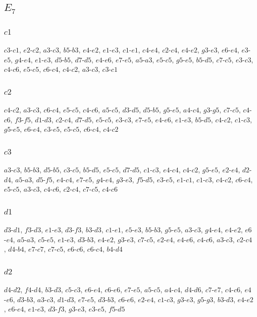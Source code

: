 \documentclass{article}
\begin{document}
\subsection{$E_7$}
\subsubsection{\large $c1$}
$c3$-$c1$, $e2$-$c2$, $a3$-$c3$, $b5$-$b3$, $e4$-$e2$, $e1$-$e3$, $c1$-$e1$, $c4$-$e4$, $c2$-$c4$, $e4$-$e2$, $g3$-$e3$, $e6$-$e4$, $e3$-$e5$, $g4$-$e4$, $e1$-$e3$, $d5$-$b5$, $d7$-$d5$, $e4$-$e6$, $e7$-$e5$, $a5$-$a3$, $e5$-$c5$, $g5$-$e5$, $b5$-$d5$, $c7$-$c5$, $e3$-$c3$, $c4$-$c6$, $e5$-$c5$, $c6$-$c4$, $c4$-$c2$, $a3$-$c3$, $c3$-$c1$

\subsubsection{\large $c2$}
$c4$-$c2$, $a3$-$c3$, $c6$-$c4$, $e5$-$c5$, $c4$-$c6$, $a5$-$c5$, $d3$-$d5$, $d5$-$b5$, $g5$-$e5$, $a4$-$c4$, $g3$-$g5$, $c7$-$c5$, $c4$-$c6$, $f3$-$f5$, $d1$-$d3$, $c2$-$c4$, $d7$-$d5$, $e5$-$c5$, $e3$-$c3$, $e7$-$e5$, $e4$-$e6$, $e1$-$e3$, $b5$-$d5$, $c4$-$c2$, $c1$-$c3$, $g5$-$e5$, $e6$-$e4$, $e3$-$e5$, $e5$-$c5$, $c6$-$c4$, $c4$-$c2$

\subsubsection{\large $c3$}
$a3$-$c3$, $b5$-$b3$, $d5$-$b5$, $c3$-$c5$, $b5$-$d5$, $e5$-$c5$, $d7$-$d5$, $c1$-$c3$, $e4$-$c4$, $c4$-$c2$, $g5$-$e5$, $e2$-$e4$, $d2$-$d4$, $a5$-$a3$, $d5$-$f5$, $e4$-$c4$, $e7$-$e5$, $g4$-$e4$, $g3$-$e3$, $f5$-$d5$, $e3$-$e5$, $e1$-$c1$, $c1$-$c3$, $c4$-$c2$, $c6$-$c4$, $e5$-$c5$, $a3$-$c3$, $c4$-$c6$, $c2$-$c4$, $c7$-$c5$, $c4$-$c6$

\subsubsection{\large $d1$}
$d3$-$d1$, $f3$-$d3$, $e1$-$e3$, $d3$-$f3$, $b3$-$d3$, $c1$-$e1$, $e5$-$e3$, $b5$-$b3$, $g5$-$e5$, $a3$-$c3$, $g4$-$e4$, $e4$-$e2$, $e6$-$e4$, $a5$-$a3$, $c5$-$e5$, $e1$-$e3$, $d3$-$b3$, $e4$-$e2$, $g3$-$e3$, $c7$-$c5$, $e2$-$e4$, $e4$-$e6$, $c4$-$c6$, $a3$-$c3$, $c2$-$c4$, $d4$-$b4$, $e7$-$c7$, $c7$-$c5$, $e6$-$c6$, $c6$-$c4$, $b4$-$d4$

\subsubsection{\large $d2$}
$d4$-$d2$, $f4$-$d4$, $b3$-$d3$, $c5$-$c3$, $e6$-$e4$, $c6$-$e6$, $e7$-$e5$, $a5$-$c5$, $a4$-$c4$, $d4$-$d6$, $c7$-$e7$, $c4$-$c6$, $e4$-$e6$, $d3$-$b3$, $a3$-$c3$, $d1$-$d3$, $e7$-$e5$, $d3$-$b3$, $c6$-$e6$, $e2$-$e4$, $c1$-$c3$, $g3$-$e3$, $g5$-$g3$, $b3$-$d3$, $e4$-$e2$, $e6$-$e4$, $e1$-$e3$, $d3$-$f3$, $g3$-$e3$, $e3$-$e5$, $f5$-$d5$
\end{document}
